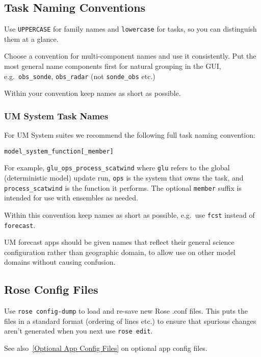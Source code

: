 \subsection{Task Naming Conventions}

Use \lstinline=UPPERCASE= for family names and \lstinline=lowercase=
for tasks, so you can distinguish them at a glance.

Choose a convention for multi-component names and use it consistently. Put the
most general name components first for natural grouping in the GUI, e.g.\
\lstinline=obs_sonde=, \lstinline=obs_radar= (not \lstinline=sonde_obs= etc.)

Within your convention keep names as short as possible.

\subsubsection{UM System Task Names}

For UM System suites we recommend the following full task naming convention:

\lstset{language=suiterc}
\begin{lstlisting}
model_system_function[_member]
\end{lstlisting}

For example, \lstinline=glu_ops_process_scatwind= where \lstinline=glu= refers
to the global (deterministic model) update run, \lstinline=ops= is the system
that owns the task, and \lstinline=process_scatwind= is the function it
performs. The optional \lstinline=member= suffix is intended for use with
ensembles as needed.

Within this convention keep names as short as possible, e.g.\ use
\lstinline=fcst= instead of \lstinline=forecast=.

UM forecast apps should be given names that reflect their general science
configuration rather than geographic domain, to allow use on other model
domains without causing confusion.

\subsection{Rose Config Files}

Use \lstinline=rose config-dump= to load and re-save new Rose .conf files. This
puts the files in a standard format (ordering of lines etc.) to ensure that
spurious changes aren't generated when you next use \lstinline=rose edit=.

See also~\ref{Optional App Config Files} on optional app config files.
